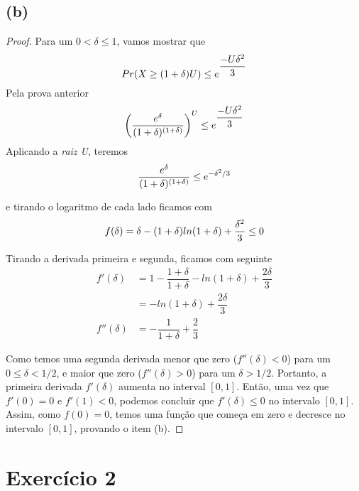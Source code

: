 \documentclass{article}
\begin{document}
\subsection*{(b)}
\begin{proof}
	Para um $0 < \delta \leq 1$, vamos mostrar que
	\begin{equation}
	\notag
		Pr( X \geq (1 + \delta)U) \leq e^{\dfrac{-U\delta^2}{3}}
	\end{equation}
	Pela prova anterior
	\begin{equation}
		\notag
		\left(\dfrac{e^{\delta}}{{(1+\delta)^{(1 + \delta)}}}\right)^{U} \leq e^{\dfrac{-U\delta^2}{3}}
	\end{equation}
	Aplicando a \emph{raiz U}, teremos
	\begin{equation}
		\notag
		\dfrac{e^{\delta}}{(1+\delta)^{(1 + \delta)}} \leq e^{-\delta^2/3}
	\end{equation}

	e tirando o logaritmo de cada lado ficamos com
	\begin{equation}
		\notag
			f(\delta) = \delta - (1 + \delta)ln(1+\delta) + \dfrac{\delta^2}{3} \leq 0\\
	\end{equation}

	Tirando a derivada primeira e segunda, ficamos com seguinte
	\begin{equation}
		\begin{split}
			f'(\delta) &= 1 - \dfrac{1+\delta}{1+\delta} - ln(1+\delta) + \dfrac{2\delta}{3}\\
			&= - ln(1+\delta) + \dfrac{2\delta}{3}\\
			f''(\delta)&= -\dfrac{1}{1+\delta} + \dfrac{2}{3}
		\end{split}
	\end{equation}

	Como temos uma segunda derivada menor que zero ($f''(\delta) < 0$) para um $0 \leq \delta <
	 1/2$, e maior que zero ($f''(\delta) > 0$) para um $\delta > 1/2$. Portanto, a primeira 
	 derivada $f'(\delta)$ aumenta no interval $[0,1]$. Então, uma vez que $f'(0) = 0$ e 
	 $f'(1) < 0$, podemos concluir que $f'(\delta) \leq 0$ no intervalo $[0,1]$.\\

	 Assim, como $f(0) = 0$, temos uma função que começa em zero e decresce no intervalo $[0,1]$, provando o item (b).
\end{proof}

\section{Exercício 2}
\end{document}
